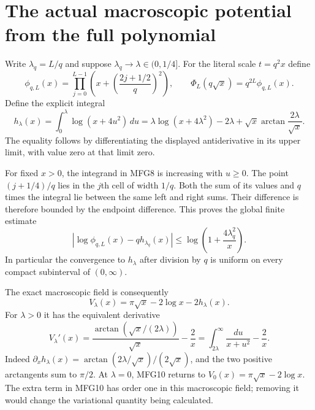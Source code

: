 \documentclass[11pt,a4paper]{article}
\begin{document}
\section{The actual macroscopic potential from the full polynomial}

Write $\lambda_q=L/q$ and suppose $\lambda_q\to\lambda\in(0,1/4]$.
For the literal scale $t=q^2x$ define
\[
 \phi_{q,L}(x)=\prod_{j=0}^{L-1}
             \left(x+\left(\frac{2j+1/2}{q}\right)^2\right),
 \qquad \Phi_L(q\sqrt x)=q^{2L}\phi_{q,L}(x).
 \tag{MFG7}
\]
Define the explicit integral
\[
 h_\lambda(x)=\int_0^\lambda\log(x+4u^2)\,du
 =\lambda\log(x+4\lambda^2)-2\lambda
                +\sqrt x\arctan\frac{2\lambda}{\sqrt x}.
 \tag{MFG8}
\]
The equality follows by differentiating the displayed antiderivative
in its upper limit, with value zero at that limit zero.

For fixed $x>0$, the integrand in MFG8 is increasing with $u\ge0$.
The point $(j+1/4)/q$ lies in the $j$th cell of width $1/q$.
Both the sum of its values and $q$ times the integral lie between
the same left and right sums. Their difference is therefore bounded
by the endpoint difference. This proves the global finite estimate
\[
 \left|\log\phi_{q,L}(x)-q h_{\lambda_q}(x)\right|
 \le\log\left(1+\frac{4\lambda_q^2}{x}\right).
 \tag{MFG9}
\]
In particular the convergence to $h_\lambda$ after division by $q$
is uniform on every compact subinterval of $(0,\infty)$.

The exact macroscopic field is consequently
\[
 \boxed{V_\lambda(x)=\pi\sqrt x-2\log x-2h_\lambda(x).}
 \tag{MFG10}
\]
For $\lambda>0$ it has the equivalent derivative
\[
 V_\lambda'(x)=\frac{\arctan(\sqrt x/(2\lambda))}{\sqrt x}-\frac2x
              =\int_{2\lambda}^{\infty}\frac{du}{x+u^2}-\frac2x.
 \tag{MFG11}
\]
Indeed $\partial_xh_\lambda(x)=
\arctan(2\lambda/\sqrt x)/(2\sqrt x)$, and the two positive
arctangents sum to $\pi/2$. At $\lambda=0$, MFG10 returns to
$V_0(x)=\pi\sqrt x-2\log x$. The extra term in MFG10 has order one
in this macroscopic field; removing it would change the variational
quantity being calculated.
\end{document}
